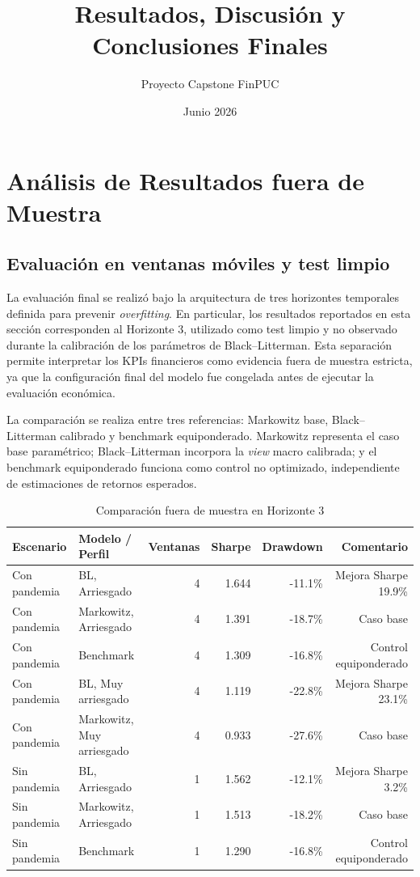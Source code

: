 \documentclass[11pt]{article}
\title{Resultados, Discusi\'on y Conclusiones Finales}
\author{Proyecto Capstone FinPUC}
\date{Junio 2026}
\begin{document}
\maketitle

\section{An\'alisis de Resultados fuera de Muestra}

\subsection{Evaluaci\'on en ventanas m\'oviles y test limpio}

La evaluaci\'on final se realiz\'o bajo la arquitectura de tres horizontes temporales definida para prevenir \textit{overfitting}. En particular, los resultados reportados en esta secci\'on corresponden al Horizonte 3, utilizado como test limpio y no observado durante la calibraci\'on de los par\'ametros de Black--Litterman. Esta separaci\'on permite interpretar los KPIs financieros como evidencia fuera de muestra estricta, ya que la configuraci\'on final del modelo fue congelada antes de ejecutar la evaluaci\'on econ\'omica.

La comparaci\'on se realiza entre tres referencias: Markowitz base, Black--Litterman calibrado y benchmark equiponderado. Markowitz representa el caso base param\'etrico; Black--Litterman incorpora la \textit{view} macro calibrada; y el benchmark equiponderado funciona como control no optimizado, independiente de estimaciones de retornos esperados.

\begin{table}[H]
\centering
\caption{Comparaci\'on fuera de muestra en Horizonte 3}
\label{tab:kpis_test}
\begin{tabular}{l l r r r r}
\toprule
Escenario & Modelo / Perfil & Ventanas & Sharpe & Drawdown & Comentario \\
\midrule
Con pandemia & BL, Arriesgado & 4 & 1.644 & -11.1\% & Mejora Sharpe 19.9\% \\
Con pandemia & Markowitz, Arriesgado & 4 & 1.391 & -18.7\% & Caso base \\
Con pandemia & Benchmark & 4 & 1.309 & -16.8\% & Control equiponderado \\
\midrule
Con pandemia & BL, Muy arriesgado & 4 & 1.119 & -22.8\% & Mejora Sharpe 23.1\% \\
Con pandemia & Markowitz, Muy arriesgado & 4 & 0.933 & -27.6\% & Caso base \\
\midrule
Sin pandemia & BL, Arriesgado & 1 & 1.562 & -12.1\% & Mejora Sharpe 3.2\% \\
Sin pandemia & Markowitz, Arriesgado & 1 & 1.513 & -18.2\% & Caso base \\
Sin pandemia & Benchmark & 1 & 1.290 & -16.8\% & Control equiponderado \\
\bottomrule
\end{tabular}
\end{table}
\end{document}
